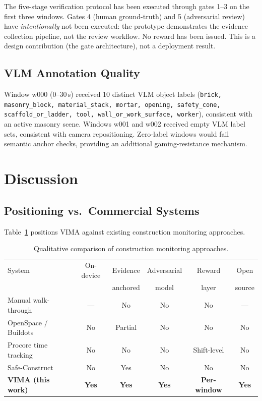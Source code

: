 \documentclass[sigconf,nonacm]{acmart}
\begin{document}
The five-stage verification protocol has been executed through gates 1--3 on the first three windows.
Gates 4 (human ground-truth) and 5 (adversarial review) have \emph{intentionally} not been executed: the prototype demonstrates the evidence collection pipeline, not the review workflow.
No reward has been issued.
This is a design contribution (the gate architecture), not a deployment result.

\subsection{VLM Annotation Quality}

Window w000 (0--30\,s) received 10 distinct VLM object labels (\texttt{brick, masonry\_block, material\_stack, mortar, opening, safety\_cone, scaffold\_or\_ladder, tool, wall\_or\_work\_surface, worker}), consistent with an active masonry scene.
Windows w001 and w002 received empty VLM label sets, consistent with camera repositioning.
Zero-label windows would fail semantic anchor checks, providing an additional gaming-resistance mechanism.

\section{Discussion}
\label{sec:discussion}

\subsection{Positioning vs.\ Commercial Systems}

Table~\ref{tab:comparison} positions VIMA against existing construction monitoring approaches.

\begin{table}[h]
\centering
\caption{Qualitative comparison of construction monitoring approaches.}
\small
\begin{tabular}{lccccc}
\toprule
System & On-device & Evidence & Adversarial & Reward & Open \\
       &           & anchored & model      & layer  & source \\
\midrule
Manual walk-through   & --- & No  & No  & No & --- \\
OpenSpace / Buildots  & No  & Partial & No & No & No \\
Procore time tracking & No  & No & No & Shift-level & No \\
Safe-Construct~\cite{chharia2025safeconstruct} & No & Yes & No & No & No \\
\textbf{VIMA (this work)} & \textbf{Yes} & \textbf{Yes} & \textbf{Yes} & \textbf{Per-window} & \textbf{Yes} \\
\bottomrule
\end{tabular}
\label{tab:comparison}
\end{table}
\end{document}
